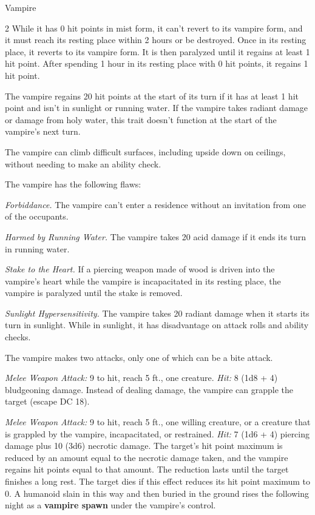 \documentclass[10pt,a4paper,twoside,bg=print,twocolumn,openany,nodeprecatedcode]{dndbook}
\begin{document}
\begin{DndMonster}[float*=b,width=\textwidth + 8pt]{Vampire}
\begin{multicols}{2}
While it has 0 hit points in mist form, it can't revert to its vampire form, and it must reach its resting place within 2 hours or be destroyed. Once in its resting place, it reverts to its vampire form. It is then paralyzed until it regains at least 1 hit point. After spending 1 hour in its resting place with 0 hit points, it regains 1 hit point.

The vampire regains 20 hit points at the start of its turn if it has at least 1 hit point and isn't in sunlight or running water. If the vampire takes radiant damage or damage from holy water, this trait doesn't function at the start of the vampire's next turn.

The vampire can climb difficult surfaces, including upside down on ceilings, without needing to make an ability check.

The vampire has the following flaws:

\textit{Forbiddance.} The vampire can't enter a residence without an invitation from one of the occupants.

\textit{Harmed by Running Water.} The vampire takes 20 acid damage if it ends its turn in running water.

\textit{Stake to the Heart.} If a piercing weapon made of wood is driven into the vampire's heart while the vampire is incapacitated in its resting place, the vampire is paralyzed until the stake is removed.

\textit{Sunlight Hypersensitivity.} The vampire takes 20 radiant damage when it starts its turn in sunlight. While in sunlight, it has disadvantage on attack rolls and ability checks.

The vampire makes two attacks, only one of which can be a bite attack.

\textsl{Melee Weapon Attack:} 9 to hit, reach 5 ft., one creature. \textsl{Hit:} 8 (1d8 + 4) bludgeoning damage. Instead of dealing damage, the vampire can grapple the target (escape DC 18).

\textsl{Melee Weapon Attack:} 9 to hit, reach 5 ft., one willing creature, or a creature that is grappled by the vampire, incapacitated, or restrained. \textsl{Hit:} 7 (1d6 + 4) piercing damage plus 10 (3d6) necrotic damage. The target's hit point maximum is reduced by an amount equal to the necrotic damage taken, and the vampire regains hit points equal to that amount. The reduction lasts until the target finishes a long rest. The target dies if this effect reduces its hit point maximum to 0. A humanoid slain in this way and then buried in the ground rises the following night as a \textbf{vampire spawn} under the vampire's control.


\end{multicols}
\end{DndMonster}
\end{document}
